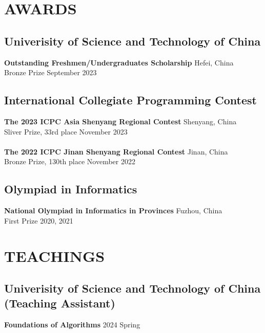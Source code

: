 \documentclass[a4paper,9pt]{extarticle}
\begin{document}
\section*{AWARDS}

\subsection*{Univerisity of Science and Technology of China}
\textbf{Outstanding Freshmen/Undergraduates Scholarship}  \hfill Hefei, China\\ 
Bronze Prize \hfill September 2023\\

\subsection*{International Collegiate Programming Contest}
\textbf{The 2023 ICPC Asia Shenyang Regional Contest}  \hfill Shenyang, China\\ 
Sliver Prize, 33rd place \hfill November 2023\\ \\
\textbf{The 2022 ICPC Jinan Shenyang Regional Contest}  \hfill Jinan, China\\ 
Bronze Prize, 130th place \hfill November 2022\\

\subsection*{Olympiad in Informatics}
\textbf{National Olympiad in Informatics in Provinces}  \hfill Fuzhou, China\\ 
First Prize \hfill 2020, 2021

\section*{TEACHINGS}
\subsection*{Univerisity of Science and Technology of China (Teaching Assistant)}
\textbf{Foundations of Algorithms}  \hfill 2024 Spring\\ %


\end{document}
